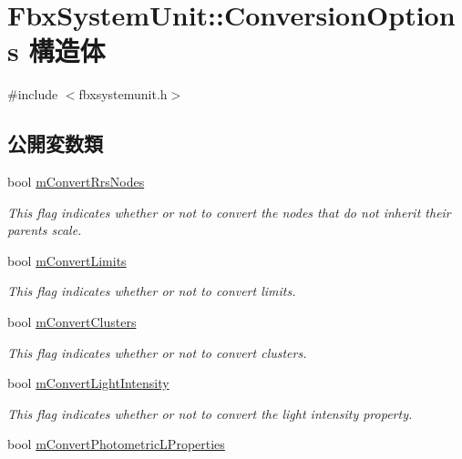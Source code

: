 \hypertarget{struct_fbx_system_unit_1_1_conversion_options}{}\section{Fbx\+System\+Unit\+:\+:Conversion\+Options 構造体}
\label{struct_fbx_system_unit_1_1_conversion_options}


{\ttfamily \#include $<$fbxsystemunit.\+h$>$}

\subsection*{公開変数類}
\begin{DoxyCompactItemize}
\item 
bool \hyperlink{struct_fbx_system_unit_1_1_conversion_options_a0043e009bb8b31f946395185a40f479d}{m\+Convert\+Rrs\+Nodes}
\begin{DoxyCompactList}\small\item\em This flag indicates whether or not to convert the nodes that do not inherit their parent\textquotesingle{}s scale. \end{DoxyCompactList}\item 
bool \hyperlink{struct_fbx_system_unit_1_1_conversion_options_a5103fb0b4e8296b56c15903724634002}{m\+Convert\+Limits}
\begin{DoxyCompactList}\small\item\em This flag indicates whether or not to convert limits. \end{DoxyCompactList}\item 
bool \hyperlink{struct_fbx_system_unit_1_1_conversion_options_a29e7efe6dcbf3e6916fc97b9144f6e1c}{m\+Convert\+Clusters}
\begin{DoxyCompactList}\small\item\em This flag indicates whether or not to convert clusters. \end{DoxyCompactList}\item 
bool \hyperlink{struct_fbx_system_unit_1_1_conversion_options_a7b567f07f8214e771ee23a0e4e03b5c0}{m\+Convert\+Light\+Intensity}
\begin{DoxyCompactList}\small\item\em This flag indicates whether or not to convert the light intensity property. \end{DoxyCompactList}\item 
bool \hyperlink{struct_fbx_system_unit_1_1_conversion_options_ac2bf3b13865eaaa9c6eecb5f696bc8d6}{m\+Convert\+Photometric\+L\+Properties}

\end{DoxyCompactItemize}
